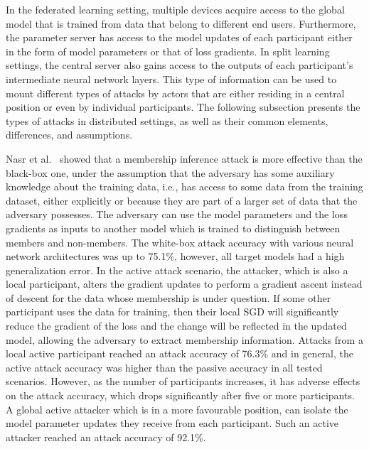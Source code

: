 In the federated learning setting, multiple devices acquire access to the global model that is trained from data that belong to different end users. Furthermore, the parameter server has access to the model updates of each participant either in the form of model parameters or that of loss gradients. In split learning settings, the central server also gains access to the outputs of each participant's intermediate neural network layers. This type of information can be used to mount different types of attacks by actors that are either residing in a central position or even by individual participants. The following subsection presents the types of attacks in distributed settings, as well as their common elements, differences, and assumptions.

Nasr et al.~ showed that a membership inference attack is more effective than the black-box one, under the assumption that the adversary has some auxiliary knowledge about the training data, i.e., has access to some data from the training dataset, either explicitly or because they are part of a larger set of data that the adversary possesses. The adversary can use the model parameters and the loss gradients as inputs to another model which is trained to distinguish between members and non-members. The white-box attack accuracy with various neural network architectures was up to 75.1\%, however, all target models had a high generalization error.
In the active attack scenario, the attacker, which is also a local participant, alters the gradient updates to perform a gradient ascent instead of descent for the data whose membership is under question. If some other participant uses the data for training, then their local SGD will significantly reduce the gradient of the loss and the change will be reflected in the updated model, allowing the adversary to extract membership information. Attacks from a local active participant reached an attack accuracy of 76.3\% and in general, the active attack accuracy was higher than the passive accuracy in all tested scenarios. However, as the number of participants increases, it has adverse effects on the attack accuracy, which drops significantly after five or more participants. A global active attacker which is in a more favourable position, can isolate the model parameter updates they receive from each participant. Such an active attacker reached an attack accuracy of 92.1\%.

